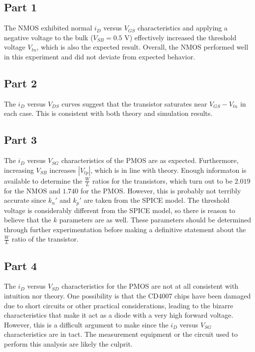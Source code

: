 \subsection{Part 1}
The NMOS exhibited normal $i_D$ versus $V_{GS}$ characteristics and applying a negative voltage to the bulk ($V_{SB} = 0.5$ \si{\volt}) effectively increased the threshold voltage $V_{tn}$, which is also the expected result. 
Overall, the NMOS performed well in this experiment and did not deviate from expected behavior.
\subsection{Part 2}
The $i_{D}$ versus $V_{DS}$ curves suggest that the transistor saturates near $V_{GS} - V_{tn}$ in each case.
This is consistent with both theory and simulation results.
\subsection{Part 3}
The $i_{D}$ versus $V_{SG}$ characteristics of the PMOS are as expected.
Furthermore, increasing $V_{SB}$ increases $|V_{tp}|$, which is in line with theory.
Enough informaton is available to determine the $\frac{W}{L}$ ratios for the transistors, which turn out to be $2.019$ for the NMOS and $1.740$ for the PMOS.
However, this is probably not terribly accurate since $k_{n}'$ and $k_{p}'$ are taken from the SPICE model.
The threshold voltage is considerably different from the SPICE model, so there is reason to believe that the $k$ parameters are as well.
These parameters should be determined through further experimentation before making a definitive statement about the $\frac{W}{L}$ ratio of the transistor.
\subsection{Part 4}
The $i_{D}$ versus $V_{SD}$ characteristics for the PMOS are not at all consistent with intuition nor theory.
One possibility is that the CD4007 chips have been damaged due to short circuits or other practical considerations, leading to the bizarre characteristics that make it act as a diode with a very high forward voltage.
However, this is a difficult argument to make since the $i_{D}$ versus $V_{SG}$ characteristics are in tact.
The measurement equipment or the circuit used to perform this analysis are likely the culprit.
